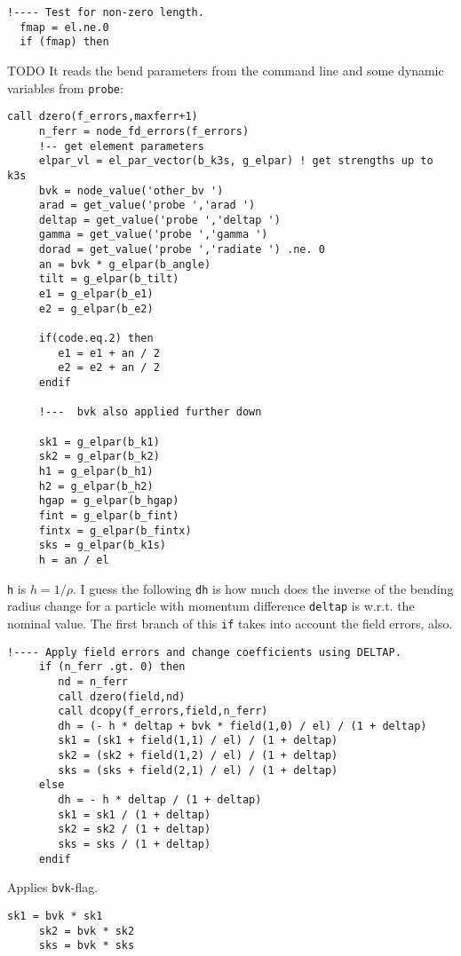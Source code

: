\documentclass{cern-art} %
\renewcommand{\L}[1]{\lstinline[firstnumber=last]{#1}}
\begin{document}
\begin{lstlisting}[firstnumber=last]
  !---- Test for non-zero length.
  fmap = el.ne.0
  if (fmap) then
  \end{lstlisting}
TODO
It reads the bend parameters from the command line and some dynamic variables from \L{probe}:
  \begin{lstlisting}[firstnumber=last]
     call dzero(f_errors,maxferr+1)
     n_ferr = node_fd_errors(f_errors)
     !-- get element parameters
     elpar_vl = el_par_vector(b_k3s, g_elpar) ! get strengths up to k3s
     bvk = node_value('other_bv ')
     arad = get_value('probe ','arad ')
     deltap = get_value('probe ','deltap ')
     gamma = get_value('probe ','gamma ')
     dorad = get_value('probe ','radiate ') .ne. 0
     an = bvk * g_elpar(b_angle)
     tilt = g_elpar(b_tilt)
     e1 = g_elpar(b_e1)
     e2 = g_elpar(b_e2)

     if(code.eq.2) then
        e1 = e1 + an / 2
        e2 = e2 + an / 2
     endif

     !---  bvk also applied further down

     sk1 = g_elpar(b_k1)
     sk2 = g_elpar(b_k2)
     h1 = g_elpar(b_h1)
     h2 = g_elpar(b_h2)
     hgap = g_elpar(b_hgap)
     fint = g_elpar(b_fint)
     fintx = g_elpar(b_fintx)
     sks = g_elpar(b_k1s)
     h = an / el
  \end{lstlisting}
\L{h} is $h=1/\rho$. I guess the following \L{dh} is how much does the inverse of the bending radius change for a particle with momentum difference \L{deltap} is w.r.t. the nominal value. The first branch of this \L{if} takes into account the field errors, also.
  \begin{lstlisting}[firstnumber=last]
     !---- Apply field errors and change coefficients using DELTAP.
     if (n_ferr .gt. 0) then
        nd = n_ferr
        call dzero(field,nd)
        call dcopy(f_errors,field,n_ferr)
        dh = (- h * deltap + bvk * field(1,0) / el) / (1 + deltap)
        sk1 = (sk1 + field(1,1) / el) / (1 + deltap)
        sk2 = (sk2 + field(1,2) / el) / (1 + deltap)
        sks = (sks + field(2,1) / el) / (1 + deltap)
     else
        dh = - h * deltap / (1 + deltap)
        sk1 = sk1 / (1 + deltap)
        sk2 = sk2 / (1 + deltap)
        sks = sks / (1 + deltap)
     endif
  \end{lstlisting}
Applies \L{bvk}-flag.
 \begin{lstlisting}[firstnumber=last]
     sk1 = bvk * sk1
     sk2 = bvk * sk2
     sks = bvk * sks
  \end{lstlisting}
\end{document}
